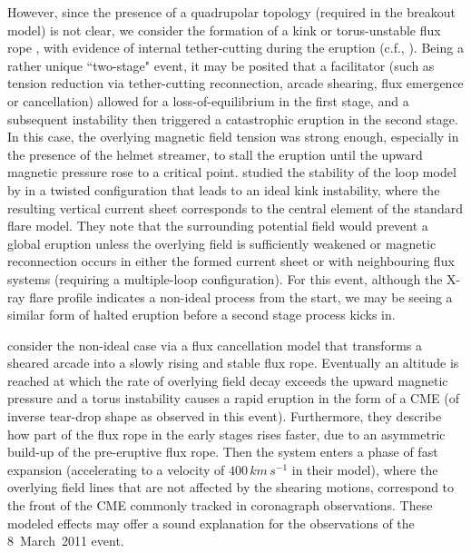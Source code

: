 \documentclass[namedreferences]{solarphysics}
\begin{document}
\begin{article}
{However, since the presence of a quadrupolar topology (required in the breakout model) is not clear, we consider the formation of a kink or torus-unstable flux rope \cite{2004A&A...413L..27T,2010ApJ...708..314A}, with evidence of internal tether-cutting during the eruption (c.f., ). Being a rather unique ``two-stage" event, it may be posited that a facilitator (such as tension reduction via tether-cutting reconnection, arcade shearing, flux emergence or cancellation) allowed for a loss-of-equilibrium in the first stage, and a subsequent instability then triggered a catastrophic eruption in the second stage. In this case, the overlying magnetic field tension was strong enough, especially in the presence of the helmet streamer, to stall the eruption until the upward magnetic pressure rose to a critical point.  studied the stability of the loop model by  in a twisted configuration that leads to an ideal kink instability, where the resulting vertical current sheet corresponds to the central element of the standard flare model. They note that the surrounding potential field would prevent a global eruption unless the overlying field is sufficiently weakened or magnetic reconnection occurs in either the formed current sheet or with neighbouring flux systems (requiring a multiple-loop configuration). For this event, although the X-ray flare profile indicates a non-ideal process from the start, we may be seeing a similar form of halted eruption before a second stage process kicks in.

 consider the non-ideal case via a flux cancellation model that transforms a sheared arcade into a slowly rising and stable flux rope. Eventually an altitude is reached at which the rate of overlying field decay exceeds the upward magnetic pressure and a torus instability causes a rapid eruption in the form of a CME (of inverse tear-drop shape as observed in this event). Furthermore, they describe how part of the flux rope in the early stages rises faster, due to an asymmetric build-up of the pre-eruptive flux rope. Then the system enters a phase of fast expansion (accelerating to a velocity of $400\,km\,s^{-1}$ in their model), where the overlying field lines that are not affected by the shearing motions, correspond to the front of the CME commonly tracked in coronagraph observations. These modeled effects may offer a sound explanation for the observations of the 8~March~2011 event.


}
\end{article}
\end{document}
